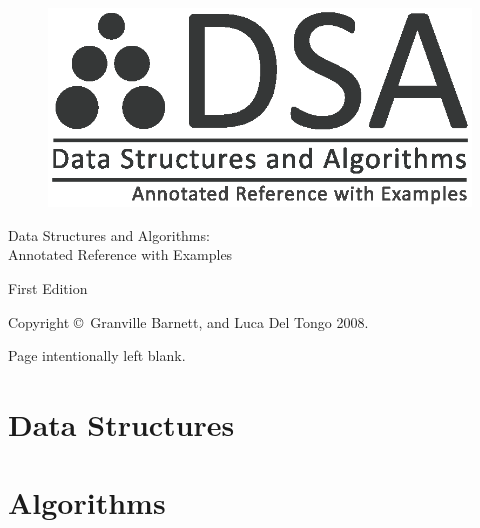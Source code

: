 \documentclass[10pt,oneside,a4paper]{report}
\begin{document}
\begin{figure}
\begin{center}
\includegraphics{dsa_logo}
\end{center}
\end{figure}
\title{}
\author{Granville Barnett\\Luca Del Tongo}
\date{}
\maketitle

\pagestyle{empty}

\newpage
\begin{center}
\Large{Data Structures and Algorithms:\\ Annotated Reference with Examples}
\end{center}
\begin{center}
\large{First Edition}
\end{center}
\begin{center}
Copyright \copyright~Granville Barnett, and Luca Del Tongo 2008.
\end{center}
\newpage

\pagestyle{plain}

\newpage
\tableofcontents
\newpage

\pagestyle{headings}



\pagestyle{empty}

\newpage
\begin{center}
Page intentionally left blank.
\end{center}
\newpage

\pagestyle{headings}


\part{Data Structures}







\part{Algorithms}






\appendix


\end{document}
